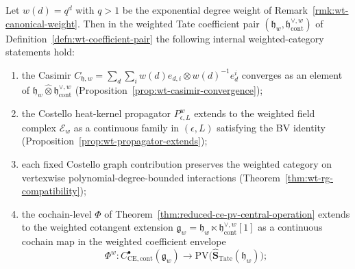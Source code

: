 \begin{thm}\label{thm:wt-cotangent-lift}
  Let $w(d)=q^d$ with $q>1$ be the exponential degree weight of
  Remark~\ref{rmk:wt-canonical-weight}. Then in the weighted Tate
  coefficient pair $(\mathfrak h_w,\mathfrak h^{\vee,w}_{\mathrm{cont}})$
  of Definition~\ref{defn:wt-coefficient-pair} the following internal
  weighted-category statements hold:
  \begin{enumerate}[label=(\alph*)]
    \item the Casimir
      $C_{\mathfrak h,w}=\sum_d\sum_i w(d)e_{d,i}\otimes
      w(d)^{-1}e^i_d$ converges as an element of
      $\mathfrak h_w\widehat\otimes
      \mathfrak h^{\vee,w}_{\mathrm{cont}}$
      (Proposition~\ref{prop:wt-casimir-convergence});
    \item the Costello heat-kernel propagator
      $P_{\epsilon,L}^{w}$ extends to the weighted field complex
      $\mathcal E_w$ as a continuous family in $(\epsilon,L)$
      satisfying the BV identity
      (Proposition~\ref{prop:wt-propagator-extends});
    \item each fixed Costello graph contribution preserves the
      weighted category on vertexwise polynomial-degree-bounded
      interactions
      (Theorem~\ref{thm:wt-rg-compatibility});
    \item the cochain-level $\Phi$ of
      Theorem~\ref{thm:reduced-ce-pv-central-operation} extends to the
      weighted cotangent extension $\mathfrak g_w=\mathfrak h_w\ltimes
      \mathfrak h^{\vee,w}_{\mathrm{cont}}[1]$ as a continuous cochain
      map in the weighted coefficient envelope
      $$\Phi^w\colon C^\bullet_{\mathrm{CE},\mathrm{cont}}(\mathfrak g_w)
        \to\mathrm{PV}\bigl(\widehat{\mathbf S}_{\mathrm{Tate}}(
        \mathfrak h_w)\bigr);$$
  \end{enumerate}
\end{thm}

